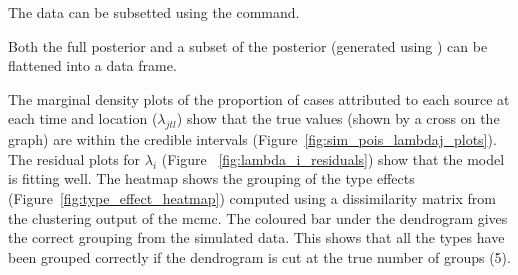 The data can be subsetted using the  command.

\begin{knitrout}
\color{fgcolor}\begin{kframe}
\begin{alltt}
  \hlstd{=} \hlstd{(}\hlstd{,} \hlstd{,} \hlstd{),}
                  \hlstd{=} \hlstd{,}  \hlstd{=} \hlstd{,}  \hlstd{=} \hlstd{(}\hlstd{,} \hlstd{),}
                  \hlstd{=} \hlstd{(}\hlstd{,} \hlstd{),}  \hlstd{=} \hlstd{(}\hlopt{:}\hlstd{))}
\end{alltt}
\end{kframe}
\end{knitrout}

Both the full posterior and a subset of the posterior (generated using ) can be flattened into a data frame.

\begin{knitrout}
\color{fgcolor}\begin{kframe}
\begin{alltt}
\end{alltt}
\end{kframe}
\end{knitrout}

The marginal density plots of the proportion of cases attributed to each source at each time and location ($\lambda_{jtl}$) show that the true values (shown by a cross on the graph) are within the 
credible intervals (Figure~\ref{fig:sim_pois_lambdaj_plots}). The residual plots for $\lambda_{i}$ (Figure~
\ref{fig:lambda_i_residuals}) show that the model is fitting well. The heatmap shows the grouping of the type effects (Figure~\ref{fig:type_effect_heatmap}) computed using a dissimilarity matrix from the clustering output of the mcmc. The coloured bar under the dendrogram gives the correct grouping from the simulated data. This shows that 
all the types have been grouped correctly if the dendrogram is cut at the true number of groups (5).

